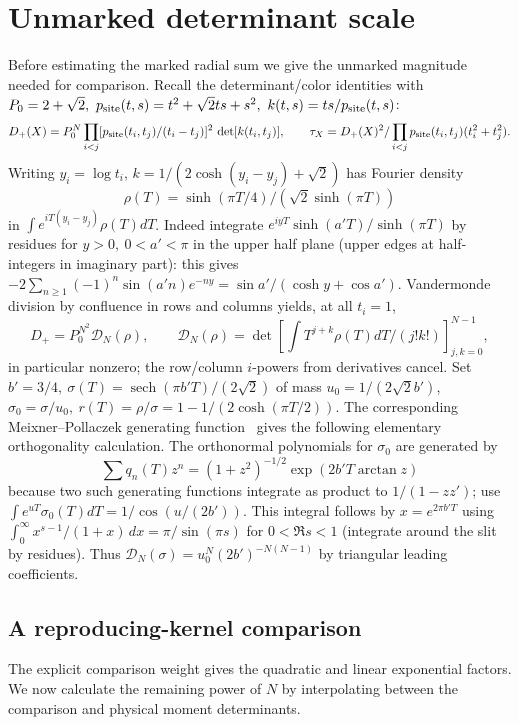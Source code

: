 \section{Unmarked determinant scale}\label{c4:determinant}

Before estimating the marked radial sum we give the unmarked magnitude needed for comparison. Recall the determinant/color identities with \(P_0=2+\sqrt2,\ p_{\rm site}(t,s)=t^2+\sqrt2 ts+s^2,\ k(t,s)=ts/p_{\rm site}(t,s)\):
\[
 D_+(X)=P_0^N\prod_{i<j}[p_{\rm site}(t_i,t_j)/(t_i-t_j)]^2\,\det[k(t_i,t_j)],\qquad
 \tau_X=D_+(X)^2/\prod_{i<j}p_{\rm site}(t_i,t_j)(t_i^2+t_j^2).
\]
Writing \(y_i=\log t_i\), \(k=1/(2\cosh(y_i-y_j)+\sqrt2)\) has Fourier density 
\[\rho(T)=\sinh(\pi T/4)/(\sqrt2\sinh(\pi T))\]
 in \(\int e^{iT(y_i-y_j)}\rho(T)dT\). Indeed integrate \(e^{iyT}\sinh(a'T)/\sinh(\pi T)\) by residues for \(y>0,\ 0<a'<\pi\) in the upper half plane (upper edges at half-integers in imaginary part): this gives \(-2\sum_{n\ge1}(-1)^n\sin(a'n)e^{-ny}=\sin a'/(\cosh y+\cos a')\). Vandermonde division by confluence in rows and columns yields, at all \(t_i=1\),
\[
 D_+=P_0^{N^2}\mathcal D_N(\rho),\qquad
 \mathcal D_N(\rho)=\det\!\left[\int T^{j+k}\rho(T)dT/(j!k!)\right]_{j,k=0}^{N-1},
\]
in particular nonzero; the row/column \(i\)-powers from derivatives cancel. Set \(b'=3/4,\ \sigma(T)=\operatorname{sech}(\pi b'T)/(2\sqrt2)\) of mass \(u_0=1/(2\sqrt2 b')\), \(\sigma_0=\sigma/u_0,\ r(T)=\rho/\sigma=1-1/(2\cosh(\pi T/2))\). The corresponding Meixner--Pollaczek generating function~\cite[Equation~18.23.7]{DLMF} gives the following elementary orthogonality calculation. The orthonormal polynomials for \(\sigma_0\) are generated by
\[
 \sum q_n(T)z^n=(1+z^2)^{-1/2}\exp(2b'T\arctan z)
\]
because two such generating functions integrate as product to \(1/(1-zz')\); use \(\int e^{uT}\sigma_0(T)dT=1/\cos(u/(2b'))\). This integral follows by \(x=e^{2\pi b'T}\) using \(\int_0^\infty x^{s-1}/(1+x)\,dx=\pi/\sin(\pi s)\) for \(0<\Re s<1\) (integrate around the slit by residues). Thus \(\mathcal D_N(\sigma)=u_0^N(2b')^{-N(N-1)}\) by triangular leading coefficients.

\subsection{A reproducing-kernel comparison}

The explicit comparison weight gives the quadratic and linear exponential factors. We now calculate the remaining power of $N$ by interpolating between the comparison and physical moment determinants.

